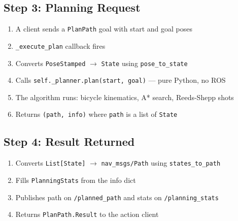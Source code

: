 \documentclass[12pt, a4paper]{article}
\begin{document}
\subsection{Step 3: Planning Request}

\begin{enumerate}[nosep]
    \item A client sends a \texttt{PlanPath} goal with start and goal poses
    \item \texttt{\_execute\_plan} callback fires
    \item Converts \texttt{PoseStamped} $\to$ \texttt{State} using \texttt{pose\_to\_state}
    \item Calls \texttt{self.\_planner.plan(start, goal)} --- pure Python, no ROS
    \item The algorithm runs: bicycle kinematics, A* search, Reeds-Shepp shots
    \item Returns \texttt{(path, info)} where \texttt{path} is a list of \texttt{State}
\end{enumerate}

\subsection{Step 4: Result Returned}

\begin{enumerate}[nosep]
    \item Converts \texttt{List[State]} $\to$ \texttt{nav\_msgs/Path} using \texttt{states\_to\_path}
    \item Fills \texttt{PlanningStats} from the info dict
    \item Publishes path on \texttt{/planned\_path} and stats on \texttt{/planning\_stats}
    \item Returns \texttt{PlanPath.Result} to the action client
\end{enumerate}
\end{document}
